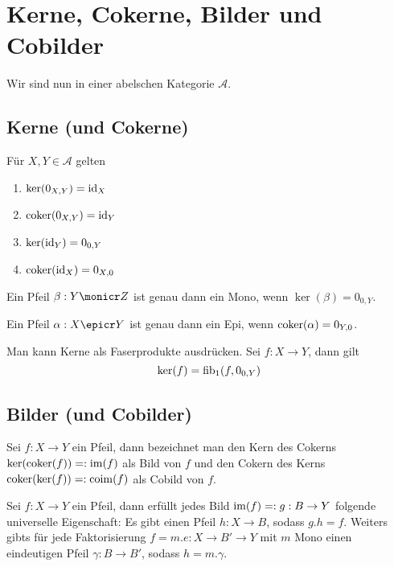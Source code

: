 \section{Kerne, Cokerne, Bilder und Cobilder}

Wir sind nun in einer abelschen Kategorie $\mathcal A$.

\subsection{Kerne (und Cokerne)}


\begin{prop}
Für $X,Y \in \mathcal A$ gelten
\begin{enumerate}
\item $\ker(0_{X,Y}) = \operatorname{id}_X$
\item $\operatorname{coker}(0_{X,Y}) = \operatorname{id}_Y$
\item $\ker(\operatorname{id}_Y) = 0_{0,Y}$
\item $\operatorname{coker}(\operatorname{id}_X) = 0_{X,0}$
\end{enumerate}
\end{prop}

\begin{prop}
Ein Pfeil $\beta : Y \monicr Z$ ist genau dann ein Mono, wenn $\ker(\beta) = 0_{0,Y}$.

Ein Pfeil $\alpha : X \epicr Y$ ist genau dann ein Epi, wenn $\operatorname{coker}(\alpha) = 0_{Y,0}$.
\end{prop}

\begin{prop}
Man kann Kerne als Faserprodukte ausdrücken. Sei $f : X\to Y$, dann gilt
\[\ker(f) = \operatorname{fib}_1(f,0_{0,Y}) \]
\end{prop}

\subsection{Bilder (und Cobilder)}

\begin{defn}
Sei $f : X\to Y$ ein Pfeil, dann bezeichnet man den Kern des Cokerns $\ker(\operatorname{coker}(f)) =: \operatorname{im}(f)$ als Bild von $f$
und den Cokern des Kerns $\operatorname{coker}(\ker(f)) =: \operatorname{coim}(f)$ als Cobild von $f$.
\end{defn}

\begin{prop}
Sei $f:X\to Y$ ein Pfeil, dann erfüllt jedes Bild $\operatorname{im}(f) =: g : B \to Y$ folgende universelle Eigenschaft:
Es gibt einen Pfeil $h : X \to B$, sodass $g.h = f$. Weiters gibts für jede Faktorisierung $f = m . e : X \to B' \to Y$ mit $m$ Mono einen eindeutigen Pfeil $\gamma : B \to B'$, sodass $h = m.\gamma$.
\end{prop}

